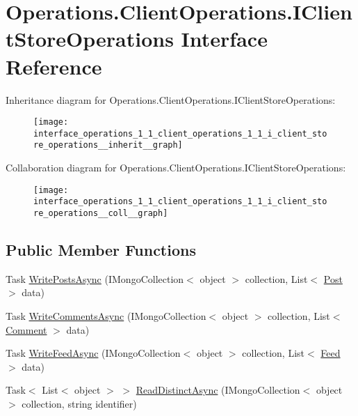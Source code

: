 \hypertarget{interface_operations_1_1_client_operations_1_1_i_client_store_operations}{}\section{Operations.\+Client\+Operations.\+I\+Client\+Store\+Operations Interface Reference}
\label{interface_operations_1_1_client_operations_1_1_i_client_store_operations}


Inheritance diagram for Operations.\+Client\+Operations.\+I\+Client\+Store\+Operations\+:
\nopagebreak
\begin{figure}[H]
\begin{center}
\leavevmode
\texttt{[image: interface\_operations\_1\_1\_client\_operations\_1\_1\_i\_client\_store\_operations\_\_inherit\_\_graph]}
\end{center}
\end{figure}


Collaboration diagram for Operations.\+Client\+Operations.\+I\+Client\+Store\+Operations\+:
\nopagebreak
\begin{figure}[H]
\begin{center}
\leavevmode
\texttt{[image: interface\_operations\_1\_1\_client\_operations\_1\_1\_i\_client\_store\_operations\_\_coll\_\_graph]}
\end{center}
\end{figure}
\subsection*{Public Member Functions}
\begin{DoxyCompactItemize}
\item 
Task \hyperlink{interface_operations_1_1_client_operations_1_1_i_client_store_operations_a2743597c6fcc8febf6f9daf7fa3b9674}{Write\+Posts\+Async} (I\+Mongo\+Collection$<$ object $>$ collection, List$<$ \hyperlink{class_data_1_1_facebook_objects_1_1_post}{Post} $>$ data)
\item 
Task \hyperlink{interface_operations_1_1_client_operations_1_1_i_client_store_operations_ac8bf8dadd81dd475a6d5af46f317d5ce}{Write\+Comments\+Async} (I\+Mongo\+Collection$<$ object $>$ collection, List$<$ \hyperlink{class_data_1_1_facebook_objects_1_1_comment}{Comment} $>$ data)
\item 
Task \hyperlink{interface_operations_1_1_client_operations_1_1_i_client_store_operations_afba8359dddb9d31552c53591eb0dca7f}{Write\+Feed\+Async} (I\+Mongo\+Collection$<$ object $>$ collection, List$<$ \hyperlink{class_data_1_1_facebook_objects_1_1_feed}{Feed} $>$ data)
\item 
Task$<$ List$<$ object $>$ $>$ \hyperlink{interface_operations_1_1_client_operations_1_1_i_client_store_operations_af29e0f8002e77e2edf7630bf6c888724}{Read\+Distinct\+Async} (I\+Mongo\+Collection$<$ object $>$ collection, string identifier)
\end{DoxyCompactItemize}


